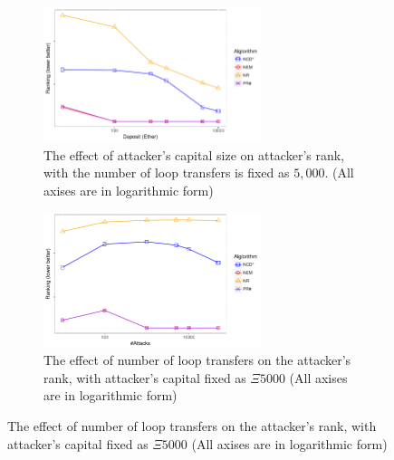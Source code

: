 \begin{figure}[htbp]
	\centering
	\begin{subfigure}{\linewidth}
		\centering
		\includegraphics[width=0.7\textwidth]{figs/AttackDeposit.pdf}
		\caption{The effect of attacker's capital size on attacker's rank, with the number of loop transfers is fixed as $5,000$. \small{(All axises are in logarithmic form)}}
		\label{subfig:deposit}
	\end{subfigure}
	
	\begin{subfigure}{\linewidth}
	    \centering
		\includegraphics[width=0.7\textwidth]{figs/AttackTimes.pdf} 
		\caption{The effect of number of loop transfers on the attacker's rank, with attacker's capital fixed as $\Xi5000$ \small{(All axises are in logarithmic form)}}\label{subfig:times}
	\end{subfigure}


\end{figure}
